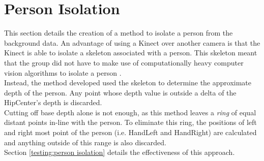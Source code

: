\section{Person Isolation}
\label{design:person isolation}
This section details the creation of a method to isolate a person from the background data.
An advantage of using a Kinect over another camera is that the Kinect is able to isolate a skeleton associated with a person.
This skeleton meant that the group did not have to make use of computationally heavy computer vision algorithms to isolate a person .\\

Instead, the method developed used the skeleton to determine the approximate depth of the person. 
Any point whose depth value is outside a delta of the HipCenter's depth is discarded.\\ 

Cutting off base depth alone is not enough, as this method leaves a \textit{ring} of equal distant points in-line with the person. 
To eliminate this ring, the positions of left and right most point of the person (i.e. HandLeft and HandRight) are calculated and anything outside of this range is also discarded. \\

Section \ref{testing:person isolation} details the effectiveness of this approach.